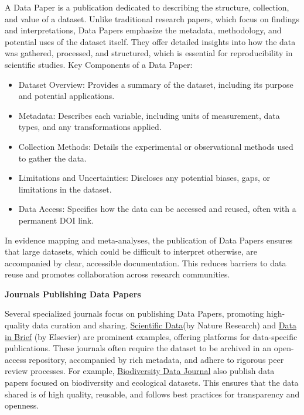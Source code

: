 \documentclass[
]{book}
\providecommand{\tightlist}{%
  \setlength{\itemsep}{0pt}\setlength{\parskip}{0pt}}
\begin{document}
A Data Paper is a publication dedicated to describing the structure, collection, and value of a dataset.
Unlike traditional research papers, which focus on findings and interpretations, Data Papers emphasize the metadata, methodology, and potential uses of the dataset itself.
They offer detailed insights into how the data was gathered, processed, and structured, which is essential for reproducibility in scientific studies.
Key Components of a Data Paper:

\begin{itemize}
\tightlist
\item
  Dataset Overview: Provides a summary of the dataset, including its purpose and potential applications.\\
\item
  Metadata: Describes each variable, including units of measurement, data types, and any transformations applied.\\
\item
  Collection Methods: Details the experimental or observational methods used to gather the data.\\
\item
  Limitations and Uncertainties: Discloses any potential biases, gaps, or limitations in the dataset.\\
\item
  Data Access: Specifies how the data can be accessed and reused, often with a permanent DOI link.
\end{itemize}

In evidence mapping and meta-analyses, the publication of Data Papers ensures that large datasets, which could be difficult to interpret otherwise, are accompanied by clear, accessible documentation.
This reduces barriers to data reuse and promotes collaboration across research communities.

\textbf{Journals Publishing Data Papers}

Several specialized journals focus on publishing Data Papers, promoting high-quality data curation and sharing.
\href{https://www.nature.com/sdata/}{Scientific Data}(by Nature Research) and \href{https://www.sciencedirect.com/journal/data-in-brief}{Data in Brief} (by Elsevier) are prominent examples, offering platforms for data-specific publications.
These journals often require the dataset to be archived in an open-access repository, accompanied by rich metadata, and adhere to rigorous peer review processes.
For example, \href{https://bdj.pensoft.net/}{Biodiversity Data Journal} also publish data papers focused on biodiversity and ecological datasets.
This ensures that the data shared is of high quality, reusable, and follows best practices for transparency and openness.
\end{document}
